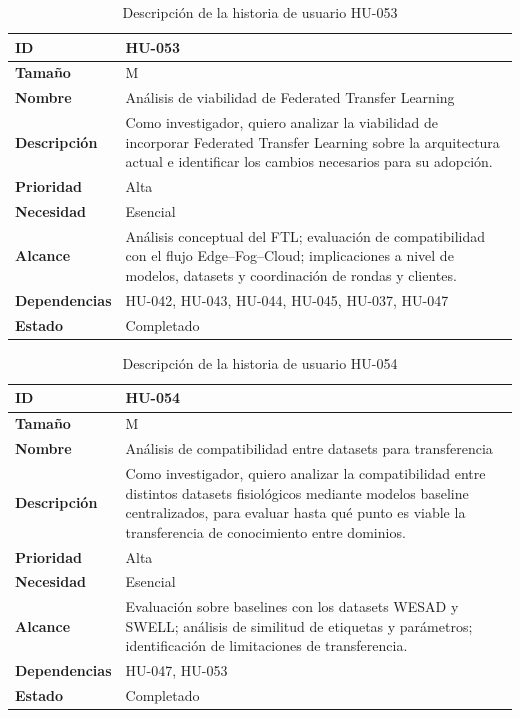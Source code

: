 \documentclass{report}
\begin{document}
\begin{table}[H]
\centering
\caption{Descripción de la historia de usuario HU-053}
\label{tab:hu053}
\begin{tabular}{|l|p{12cm}|}
\hline
\textbf{ID} & HU-053 \\ \hline
\textbf{Tamaño} & M \\ \hline
\textbf{Nombre} & Análisis de viabilidad de Federated Transfer Learning \\ \hline
\textbf{Descripción} &
Como investigador, quiero analizar la viabilidad de incorporar Federated Transfer Learning sobre la arquitectura actual e identificar los cambios necesarios para su adopción. \\ \hline
\textbf{Prioridad} & Alta \\ \hline
\textbf{Necesidad} & Esencial \\ \hline
\textbf{Alcance} &
Análisis conceptual del FTL; evaluación de compatibilidad con el flujo Edge--Fog--Cloud; implicaciones a nivel de modelos, datasets y coordinación de rondas y clientes. \\ \hline
\textbf{Dependencias} &
HU-042, HU-043, HU-044, HU-045, HU-037, HU-047 \\ \hline
\textbf{Estado} & Completado \\ \hline
\end{tabular}
\end{table}




\begin{table}[H]
\centering
\caption{Descripción de la historia de usuario HU-054}
\label{tab:hu054}
\begin{tabular}{|l|p{12cm}|}
\hline
\textbf{ID} & HU-054 \\ \hline
\textbf{Tamaño} & M \\ \hline
\textbf{Nombre} & Análisis de compatibilidad entre datasets para transferencia \\ \hline
\textbf{Descripción} &
Como investigador, quiero analizar la compatibilidad entre distintos datasets fisiológicos mediante modelos baseline centralizados, para evaluar hasta qué punto es viable la transferencia de conocimiento entre dominios.\\ \hline
\textbf{Prioridad} & Alta \\ \hline
\textbf{Necesidad} & Esencial \\ \hline
\textbf{Alcance} &
Evaluación sobre baselines con los datasets WESAD y SWELL; análisis de similitud de etiquetas y parámetros; identificación de limitaciones de transferencia.\\ \hline
\textbf{Dependencias} &
HU-047, HU-053 \\ \hline
\textbf{Estado} & Completado \\ \hline
\end{tabular}
\end{table}
\end{document}
